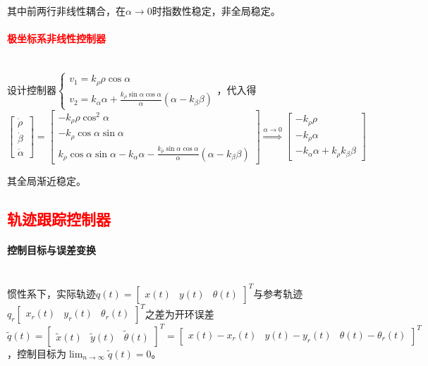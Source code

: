 \documentclass[
12pt, %
a4paper, 
oneside, %
]{scrartcl}
\begin{document}
其中前两行非线性耦合，在$ \alpha \to 0 $时指数性稳定，非全局稳定。
\paragraph{\textcolor{red}{极坐标系非线性控制器}}~\\

设计控制器$ \begin{cases} v_1 = k_\rho \rho \cos\alpha \\ v_2 = k_\alpha \alpha + \frac{k_\rho \sin\alpha \cos\alpha}{\alpha}(\alpha - k_\beta \beta) \end{cases} $，代入得
$$ 
\begin{bmatrix} \dot{\rho} \\ \dot{\beta} \\ \dot{\alpha} \end{bmatrix} 
= \begin{bmatrix} -k_\rho \rho \cos^2\alpha \\ -k_\rho \cos\alpha \sin\alpha \\ k_\rho \cos\alpha \sin\alpha - k_\alpha \alpha - \frac{k_\rho \sin\alpha \cos\alpha}{\alpha} (\alpha - k_\beta \beta) \end{bmatrix} 
\overset{\alpha \to 0}{\Longrightarrow} \begin{bmatrix} -k_\rho \rho \\ -k_\rho \alpha \\ - k_\alpha \alpha + k_\rho k_\beta \beta \end{bmatrix} 
$$

其全局渐近稳定。
\subsection[轨迹跟踪控制器]{\textcolor{red}{轨迹跟踪控制器}}
\paragraph{控制目标与误差变换}~\\

惯性系下，实际轨迹$ q(t) = \begin{bmatrix} x(t) & y(t) & \theta(t) \end{bmatrix}^T $与参考轨迹$ q_r \begin{bmatrix} x_r(t) & y_r(t) & \theta_r(t) \end{bmatrix}^T $之差为开环误差$ \tilde{q}(t) = \begin{bmatrix} \tilde{x}(t) & \tilde{y}(t) & \tilde{\theta}(t) \end{bmatrix}^T = \begin{bmatrix} x(t) - x_r(t) & y(t) - y_r(t) & \theta(t) - \theta_r(t) \end{bmatrix}^T $，控制目标为$ \lim_{n \to \infty} \tilde{q}(t) = 0 $。
\end{document}
